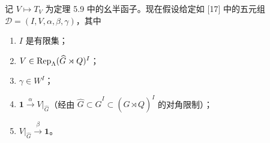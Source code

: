 记 $V\mapsto T_{V}$ 为定理 5.9 中的幺半函子。现在假设给定如 [17] 中的五元组 $\mathcal{D}=(I,V,\alpha,\beta,\gamma)$，其中
\begin{enumerate}[(1)]
\item $I$ 是有限集；
\item $V\in\operatorname{Rep}_{\Lambda}(\widehat{G}\rtimes Q)^{I}$；
\item $\gamma\in W^{I}$；
\item $\mathbf{1}\xrightarrow{\alpha}V|_{\widehat{G}}$（经由 $\widehat{G}\subset\widehat{G}^{I}\subset(\widehat{G}\rtimes Q)^{I}$ 的对角限制）；
\item $V|_{\widehat{G}}\xrightarrow{\beta}\mathbf{1}$。
\end{enumerate}
